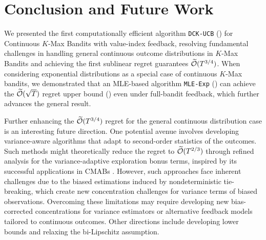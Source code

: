 \section{Conclusion and Future Work}

We presented the first computationally efficient algorithm \texttt{DCK-UCB} () for Continuous $K$-Max Bandits with value-index feedback, resolving fundamental challenges in handling general continuous outcome distributions in $K$-Max Bandits and achieving the first sublinear regret guarantees $\widetilde{{\mathcal{O}}}(T^{3/4})$. 
When considering exponential distributions as a special case of continuous $K$-Max bandits, we demonstrated that an MLE-based algorithm \texttt{MLE-Exp} () can achieve the $\widetilde{{\mathcal{O}}}(\sqrt{T})$ regret upper bound () even under full-bandit feedback, which further advances the general result.

Further enhancing the $\widetilde{{\mathcal{O}}}(T^{3/4})$ regret for the general continuous distribution case is an interesting future direction. One potential avenue involves developing variance-aware algorithms that adapt to second-order statistics of the outcomes. Such methods might theoretically reduce the regret to $\widetilde{\mathcal{O}}(T^{2/3})$ through refined analysis for the variance-adaptive exploration bonus terms, inspired by its successful applications in CMABs \citep{liu2023contextual,liu2024combinatorial}. However, such approaches face inherent challenges due to the biased estimations induced by nondeterministic tie-breaking, which create new concentration challenges for variance terms of biased observations. Overcoming these limitations may require developing new bias-corrected concentrations for variance estimators or alternative feedback models tailored to continuous outcomes. 
Other directions include developing lower bounds and relaxing the bi-Lipschitz assumption.


